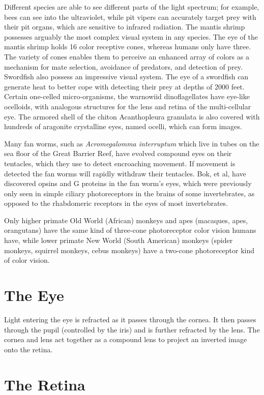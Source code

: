 Different species are able to see different parts of the light spectrum; for example, bees can see into the ultraviolet, while pit vipers can accurately target prey with their pit organs, which are sensitive to infrared radiation. The mantis shrimp possesses arguably the most complex visual system in any species. The eye of the mantis shrimp holds 16 color receptive cones, whereas humans only have three. The variety of cones enables them to perceive an enhanced array of colors as a mechanism for mate selection, avoidance of predators, and detection of prey. Swordfish also possess an impressive visual system. The eye of a swordfish can generate heat to better cope with detecting their prey at depths of 2000 feet. Certain one-celled micro-organisms, the warnowiid dinoflagellates have eye-like ocelloids, with analogous structures for the lens and retina of the multi-cellular eye. The armored shell of the chiton Acanthopleura granulata is also covered with hundreds of aragonite crystalline eyes, named ocelli, which can form images.

Many fan worms, such as \emph{Acromegalomma interruptum} which live in tubes on the sea floor of the Great Barrier Reef, have evolved compound eyes on their tentacles, which they use to detect encroaching movement. If movement is detected the fan worms will rapidly withdraw their tentacles. Bok, et al, have discovered opsins and G proteins in the fan worm's eyes, which were previously only seen in simple ciliary photoreceptors in the brains of some invertebrates, as opposed to the rhabdomeric receptors in the eyes of most invertebrates.

Only higher primate Old World (African) monkeys and apes (macaques, apes, orangutans) have the same kind of three-cone photoreceptor color vision humans have, while lower primate New World (South American) monkeys (spider monkeys, squirrel monkeys, cebus monkeys) have a two-cone photoreceptor kind of color vision.

\hypertarget{the-eye}{%
\section{The Eye}\label{the-eye}}

Light entering the eye is refracted as it passes through the cornea. It then passes through the pupil (controlled by the iris) and is further refracted by the lens. The cornea and lens act together as a compound lens to project an inverted image onto the retina.

\hypertarget{the-retina}{%
\section{The Retina}\label{the-retina}}

